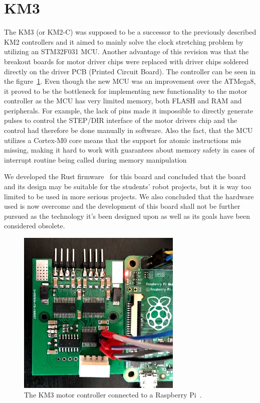 \section{KM3}
\label{sec:km3}
The KM3 (or KM2-C) was supposed to be a successor to the previously described KM2 controllers and it aimed to mainly solve the clock stretching problem by utilizing an STM32F031 MCU.
Another advantage of this revision was that the breakout boards for motor driver chips were replaced with driver chips soldered directly on the driver PCB (Printed Circuit Board).
The controller can be seen in the figure~\ref{fig:km3}.
Even though the new MCU was an improvement over the ATMega8, it proved to be the bottleneck for implementing new functionality to the motor controller as the MCU has very limited memory, both FLASH and RAM and peripherals.
For example, the lack of pins made it impossible to directly generate pulses to control the STEP/DIR interface of the motor drivers chip and the control had therefore be done manually in software.
Also the fact, that the MCU utilizes a Cortex-M0 core means that the support for atomic instructions mis missing, making it hard to work with guarantees about memory safety in cases of interrupt routine being called during memory manipulation

We developed the Rust firmware~\cite{km3-firmware} for this board and concluded that the board and its design may be suitable for the students' robot projects, but it is way too limited to be used in more serious projects.
We also concluded that the hardware used is now overcome and the development of this board shall not be further pursued as the technology it's been designed upon as well as its goals have been considered obsolete.

\begin{figure}[H]
    \centering
    \includegraphics[width=0.7\textwidth]{obrazky/km3}
    \caption{The KM3 motor controller connected to a Raspberry Pi~\cite{km2render}.}
    \label{fig:km3}
\end{figure}

